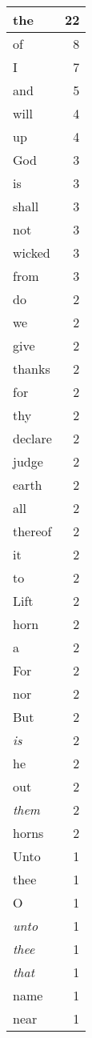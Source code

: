 \begin{center}
\begin{longtable}{l|r}
\hline \hline
\endlastfoot
the & 22 \\ \hline
of & 8 \\ \hline
I & 7 \\ \hline
and & 5 \\ \hline
will & 4 \\ \hline
up & 4 \\ \hline
God & 3 \\ \hline
is & 3 \\ \hline
shall & 3 \\ \hline
not & 3 \\ \hline
wicked & 3 \\ \hline
from & 3 \\ \hline
do & 2 \\ \hline
we & 2 \\ \hline
give & 2 \\ \hline
thanks & 2 \\ \hline
for & 2 \\ \hline
thy & 2 \\ \hline
declare & 2 \\ \hline
judge & 2 \\ \hline
earth & 2 \\ \hline
all & 2 \\ \hline
thereof & 2 \\ \hline
it & 2 \\ \hline
to & 2 \\ \hline
Lift & 2 \\ \hline
horn & 2 \\ \hline
a & 2 \\ \hline
For & 2 \\ \hline
nor & 2 \\ \hline
But & 2 \\ \hline
\emph{is} & 2 \\ \hline
he & 2 \\ \hline
out & 2 \\ \hline
\emph{them} & 2 \\ \hline
horns & 2 \\ \hline
Unto & 1 \\ \hline
thee & 1 \\ \hline
O & 1 \\ \hline
\emph{unto} & 1 \\ \hline
\emph{thee} & 1 \\ \hline
\emph{that} & 1 \\ \hline
name & 1 \\ \hline
near & 1 \\ \hline

\end{longtable}
\end{center}
